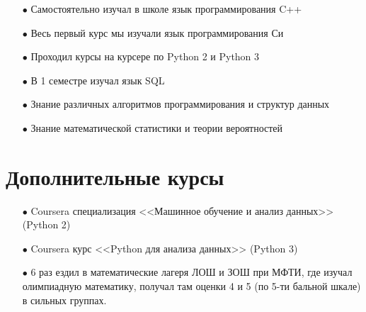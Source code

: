 \documentclass[a4paper,12pt]{article} %
\begin{document}
\begin{enumerate}

\item[$\bullet$] Самостоятельно изучал в школе язык программирования C++

\item[$\bullet$] Весь первый курс мы изучали язык программирования Си

\item[$\bullet$] Проходил курсы на курсере по Python 2 и Python 3

\item[$\bullet$] В 1 семестре изучал язык SQL

\item[$\bullet$] Знание различных алгоритмов программирования и структур данных

\item[$\bullet$] Знание математической статистики и теории вероятностей

\end{enumerate}

\section*{Дополнительные курсы}

\begin{enumerate}

\item[$\bullet$] Coursera специализация <<Машинное обучение и анализ данных>> (Python 2)

\item[$\bullet$] Coursera курс <<Python для анализа данных>> (Python 3)

\item[$\bullet$] 6 раз ездил в математические лагеря ЛОШ и ЗОШ при МФТИ, где изучал олимпиадную математику, получал там оценки 4 и 5 (по 5-ти бальной шкале) в сильных группах.

\end{enumerate}
\end{document}
